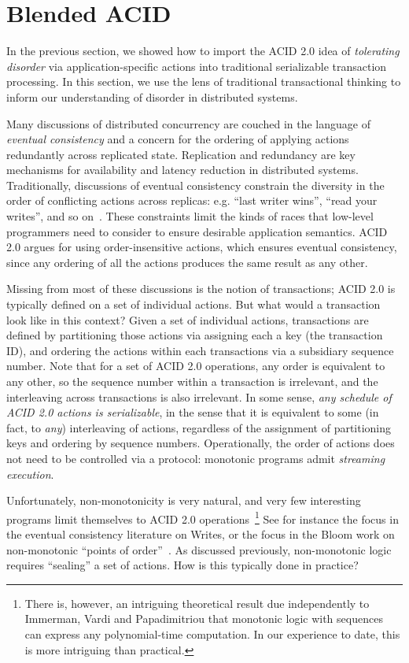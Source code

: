 \documentclass{sig-alternate}
\begin{document}
\section{Blended ACID}
In the previous section, we showed how to import the ACID 2.0 idea of
\emph{tolerating disorder} via application-specific actions into traditional
serializable transaction processing. In this section, we use the lens of
traditional transactional thinking to inform our understanding of disorder in
distributed systems.

Many discussions of distributed concurrency are couched in the language of
\emph{eventual consistency} and a concern for the ordering of applying actions
redundantly across replicated state.  Replication and redundancy are key
mechanisms for availability and latency reduction in distributed systems.
Traditionally, discussions of eventual consistency constrain the diversity in
the order of conflicting actions across replicas: e.g. ``last writer wins'',
``read your writes'', and so on~\cite{Terry1994}.  These constraints limit the kinds
of races that low-level programmers need to consider to ensure desirable
application semantics.  ACID 2.0 argues for using order-insensitive actions,
which ensures eventual consistency, since any ordering of all the actions
produces the same result as any other.

Missing from most of these discussions is the notion of transactions; ACID 2.0
is typically defined on a set of individual actions.  But what would a
transaction look like in this context?  Given a set of individual actions,
transactions are defined by partitioning those actions via assigning each a key
(the transaction ID), and ordering the actions within each transactions via a
subsidiary sequence number.  Note that for a set of ACID 2.0 operations, any
order is equivalent to any other, so the sequence number within a transaction is
irrelevant, and the interleaving across transactions is also irrelevant.  In
some sense, \emph{any schedule of ACID 2.0 actions is serializable}, in the
sense that it is equivalent to some (in fact, to \emph{any}) interleaving of
actions, regardless of the assignment of partitioning keys and ordering by
sequence numbers.  Operationally, the order of actions does not need to be
controlled via a protocol: monotonic programs admit \emph{streaming execution}.

Unfortunately, non-monotonicity is very natural, and very few interesting
programs limit themselves to ACID 2.0 operations~\footnote{There is, however, an
  intriguing theoretical result due independently to Immerman, Vardi and
  Papadimitriou that monotonic logic with sequences can express any
  polynomial-time computation.  In our experience to date, this is more
  intriguing than practical.}  See for instance the focus in the eventual
consistency literature on Writes, or the focus in the Bloom work on
non-monotonic ``points of order''~\cite{Alvaro2011}.  As discussed previously,
non-monotonic logic requires ``sealing'' a set of actions.  How is this
typically done in practice?
\end{document}
